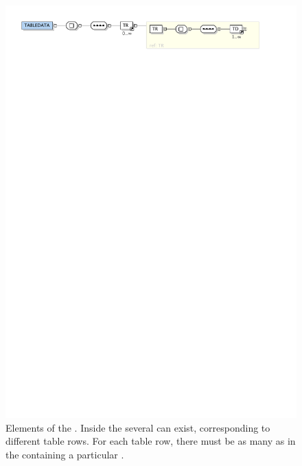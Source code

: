 \begin{figure}[tbp]
	\centering
		\includegraphics[width=\columnwidth]
		{fig/VOTableTabledataTag.pdf}
	\caption[Elements of the ]{
		Elements of the . Inside the
		 several  can exist,
		corresponding to different table rows. For each
		table row, there must be as many  as
		 in the  containing a
		particular .
	}
	\label{fig:fig_VOTableTabledataTag}
\end{figure}


